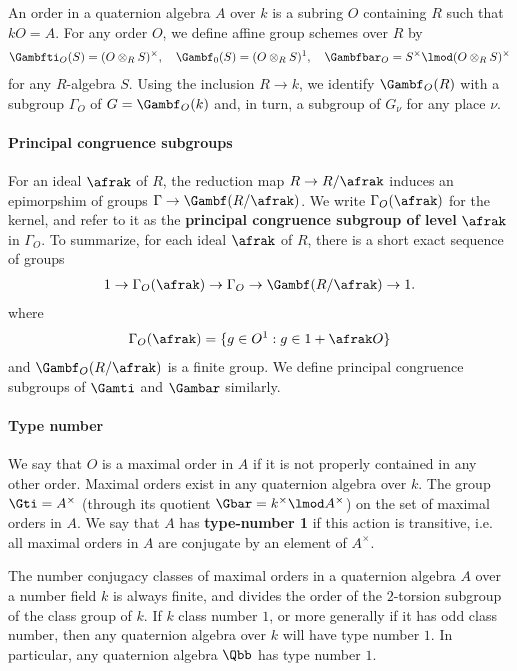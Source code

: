     An order in a quaternion algebra $A$ over $k$ is a subring $O$ containing $R$ such that $kO = A$. For any order $O$, we define affine group schemes over $R$ by
    \begin{align*}
        \Gambfti_O(S) = (O\otimes_R S)^\times, \quad \Gambf_0(S) = (O\otimes_R S)^1, \quad \Gambfbar_O = S^\times \lmod (O\otimes_R S)^\times
    \end{align*}
    for any $R$-algebra $S$. Using the inclusion $R \to k$, we identify $\Gambf_O(R)$ with a subgroup $\Gamma_O$ of $G=\Gambf_O(k)$ and, in turn, a subgroup of $G_\nu$ for any place $\nu$.






    \paragraph{Principal congruence subgroups}
    For an ideal $\afrak$ of $R$, the reduction map $R \to R/\afrak$ induces an epimorpshim of groups $\Gamma \to \Gambf (R/\afrak)$. We write $\Gamma_O(\afrak)$ for the kernel, and refer to it as the \textbf{principal congruence subgroup of level } $\afrak$ in $\Gamma_O$. To summarize, for each ideal $\afrak$ of $R$, there is a short exact sequence of groups
    \begin{align*}
        1 \to \Gamma_O (\afrak) \to \Gamma_O \to \Gambf (R/\afrak) \to 1.
    \end{align*}
    where
    \begin{align*}
        \Gamma_O(\afrak) = \{ g \in O^1: g \in 1 + \afrak O\}
    \end{align*}
    and $\Gambf_O (R/\afrak)$ is a finite group. We define principal congruence subgroups of  $\Gamti$ and $\Gambar$ similarly.

    \paragraph{Type number}
    We say that $O$ is a maximal order in $A$ if it is not properly contained in any other order. Maximal orders exist in any quaternion algebra over $k$. The group $\Gti = A^\times$ (through its quotient $\Gbar = k^\times \lmod A^\times$) on the set of maximal orders in $A$. We say that $A$ has  \textbf{type-number 1} if this action is transitive, i.e. all maximal orders in $A$ are conjugate by an element of $A^\times$.
    \begin{remark}\label{remark:classnum}
        The number conjugacy classes of maximal orders in a quaternion algebra $A$ over a number field $k$ is always finite, and divides the order of the $2$-torsion subgroup of the class group of $k$. If $k$ class number $1$, or more generally if it has odd class number, then any quaternion algebra over $k$ will have type number $1$.  In particular, any quaternion algebra $\Qbb$ has type number $1$.
    \end{remark}


